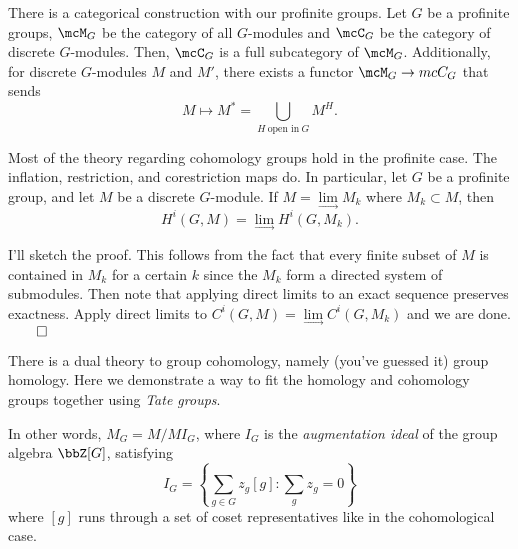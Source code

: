 \documentclass[a4paper, 12pt,oneside,openany]{book}
\begin{document}
There is a categorical construction with our profinite groups. Let $G$ be a profinite groups, $\mcM_G$ be the category of all $G$-modules and $\mcC_G$ be the category of discrete $G$-modules. Then, $\mcC_G$ is a full subcategory of $\mcM_G$. Additionally, for discrete $G$-modules $M$ and $M'$, there exists a functor $\mcM_G \to mcC_G$ that sends $$M \mapsto M^* = \bigcup\limits_{H\ \text{open in}\ G} M^H.$$

Most of the theory regarding cohomology groups hold in the profinite case. The inflation, restriction, and corestriction maps do. In particular, let $G$ be a profinite group, and let $M$ be a discrete $G$-module. If $M=\lim\limits_{\rightarrow} M_k$ where $M_k \subset M$, then $$H^i(G, M) = \lim\limits_{\rightarrow} H^i(G, M_k).$$

I'll sketch the proof. This follows from the fact that every finite subset of $M$ is contained in $M_k$ for a certain $k$ since the $M_k$ form a directed system of submodules. Then note that applying direct limits to an exact sequence preserves exactness. Apply direct limits to $C^i(G, M) = \lim\limits_{\rightarrow} C^i(G, M_k)$ and we are done. $\qed$

There is a dual theory to group cohomology, namely (you've guessed it) group homology. Here we demonstrate a way to fit the homology and cohomology groups together using \emph{Tate groups}.


In other words, $M_G = M/MI_G$, where $I_G$ is the \emph{augmentation ideal} of the group algebra $\bbZ[G]$, satisfying $$I_G = \left\{ \sum\limits_{g \in G} z_g [g]: \sum\limits_g z_g = 0 \right\}$$ where $[g]$ runs through a set of coset representatives like in the cohomological case.

\end{document}

